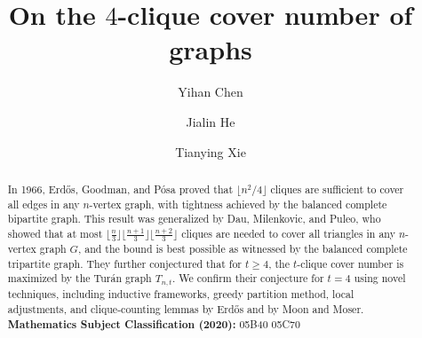 \documentclass[11pt,a4paper]{article}
\newcommand{\turangraph}[2]{T_{#1,#2}}
\begin{document}
\title{On the $4$-clique cover number of graphs}

\author{Yihan Chen\footnotemark[1]
\and Jialin He\footnotemark[2]
\and
	Tianying Xie\footnotemark[3]}
\date{}

\maketitle





\begin{abstract}
    In 1966, Erd\H{o}s, Goodman, and P{\'o}sa proved that $\lfloor n^2/4 \rfloor$ cliques are sufficient to cover all edges in any $n$-vertex graph, with tightness achieved by the balanced complete bipartite graph. 
    This result was generalized by Dau, Milenkovic, and Puleo, who showed that at most 
    $\lfloor \frac n 3 \rfloor \lfloor \frac {n+1} 3 \rfloor \lfloor \frac {n+2} 3 \rfloor$ 
    cliques are needed to cover all triangles in any $n$-vertex graph $G$, and the bound is best possible as witnessed by the balanced complete tripartite graph. 
    They further conjectured that for $t \geq 4$, the $t$-clique cover number is maximized by the Tur\'an graph $\turangraph{n}{t}$. 
    We confirm their conjecture for $t=4$ using novel techniques, including inductive frameworks, greedy partition method, local adjustments, and clique-counting lemmas by Erd\H{o}s and by Moon and Moser.\\

\textbf{Mathematics Subject Classification (2020):} 
05B40 05C70 %
\end{abstract}
\end{document}
